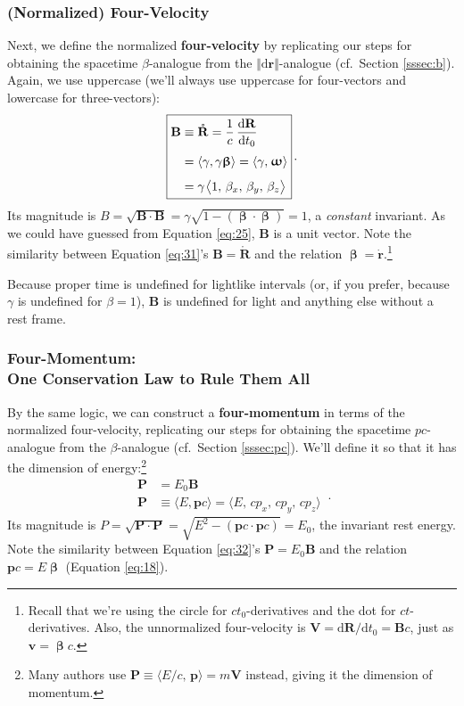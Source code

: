 \documentclass[12pt]{article}
\renewcommand{\vv}[1]{\mathbf{#1}}
\newcommand{\dd}[1]{\mathrm{d}#1}
\newcommand{\vvbeta}{\bm{\upbeta}}
\newcommand{\vvomega}{\bm{\upomega}}
\begin{document}
\subsubsection{(Normalized) Four-Velocity}

Next, we define the normalized \textbf{four-velocity} by replicating our steps for obtaining the spacetime $\beta$-analogue from the $\Vert \dd \vv r \Vert$-analogue (cf.\ Section \ref{sssec:b}). Again, we use uppercase (we'll always use uppercase for four-vectors and lowercase for three-vectors):
\begin{equation}\label{eq:31}
\boxed{
\begin{aligned}
\vv B&\equiv \mathring{\vv R} = \dfrac{1}{c} \, \dfrac{\dd \vv R}{\dd t_0} \\[3pt]
&= \langle \gamma, \gamma \vvbeta \rangle = \langle \gamma, \mkern1mu \vvomega \rangle \\[4pt]
&= \gamma \mkern1.5mu \big \langle 1, \, \beta_x, \, \beta_y, \, \beta_z \big \rangle
\end{aligned}
} \, .
\end{equation}
Its magnitude is $B = \sqrt{\vv B \cdot \vv B} = \gamma \sqrt{1 - (\vvbeta \cdot \vvbeta)} = 1$, a \emph{constant} invariant. As we could have guessed from Equation \ref{eq:25}, $\vv B$ is a unit vector. Note the similarity between Equation \ref{eq:31}'s $\vv B = \mathring{\vv R}$ and the relation $\vvbeta = \dot{\vv r}$.\footnote{Recall that we're using the circle for $c t_0$-derivatives and the dot for $ct$-derivatives. Also, the unnormalized four-velocity is $\vv V = \dd \vv R / \dd t_0 = \vv B c$, just as $\vv v = \vvbeta c$.}

Because proper time is undefined for lightlike intervals (or, if you prefer, because $\gamma$ is undefined for $\beta = 1$), $\vv B$ is undefined for light and anything else without a rest frame.


\subsubsection{Four-Momentum:\\ One Conservation Law to Rule Them All}

By the same logic, we can construct a \textbf{four-momentum} in terms of the normalized four-velocity, replicating our steps for obtaining the spacetime $p c$-analogue from the $\beta$-analogue (cf.\ Section \ref{sssec:pc}). We'll define it so that it has the dimension of energy:\footnote{Many authors use $\vv P \equiv \langle E/c , \, \vv p \rangle = m \vv V$ instead, giving it the dimension of momentum.}
\begin{equation}\label{eq:32}
\boxed{
\begin{aligned}
\vv P &= E_0 \vv B \\
\vv P &\equiv \langle E, \vv p c \rangle = \langle E, \, c p_x, \, c p_y, \, c p_z \rangle
\end{aligned}
} \, .
\end{equation}
Its magnitude is $P = \sqrt{\vv P \cdot \vv P} = \sqrt{E^2 - (\vv p c \cdot \vv p c)} = E_0$, the invariant rest energy. Note the similarity between Equation \ref{eq:32}'s $\vv P = E_0 \vv B$ and the relation $\vv p c = E \vvbeta$ (Equation \ref{eq:18}).
\end{document}
